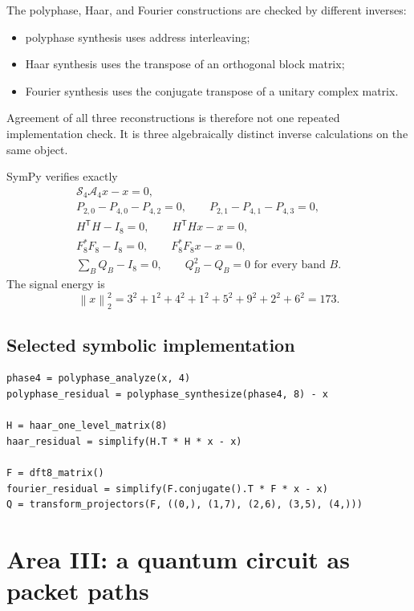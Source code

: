 \documentclass[11pt,oneside]{book}
\theoremstyle{definition}
\theoremstyle{remark}
\newcommand{\Acal}{\mathcal A}
\newcommand{\Scal}{\mathcal S}
\newcommand{\norm}[1]{\left\lVert #1\right\rVert}
\begin{document}
\begin{auditbox}
The polyphase, Haar, and Fourier constructions are checked by different inverses:
\begin{itemize}
\item polyphase synthesis uses address interleaving;
\item Haar synthesis uses the transpose of an orthogonal block matrix;
\item Fourier synthesis uses the conjugate transpose of a unitary complex matrix.
\end{itemize}
Agreement of all three reconstructions is therefore not one repeated implementation check. It is three algebraically distinct inverse calculations on the same object.
\end{auditbox}

\begin{certificate}
SymPy verifies exactly
\[
\begin{gathered}
\Scal_4\Acal_4x-x=0,\\
P_{2,0}-P_{4,0}-P_{4,2}=0,
\qquad
P_{2,1}-P_{4,1}-P_{4,3}=0,\\
H^{\mathsf T}H-I_8=0,
\qquad
H^{\mathsf T}Hx-x=0,\\
F_8^*F_8-I_8=0,
\qquad
F_8^*F_8x-x=0,\\
\sum_BQ_B-I_8=0,
\qquad
Q_B^2-Q_B=0\text{ for every band }B.
\end{gathered}
\]
The signal energy is
\[
\norm{x}_2^2=3^2+1^2+4^2+1^2+5^2+9^2+2^2+6^2=173.
\]
\end{certificate}

\section{Selected symbolic implementation}
\begin{lstlisting}
phase4 = polyphase_analyze(x, 4)
polyphase_residual = polyphase_synthesize(phase4, 8) - x

H = haar_one_level_matrix(8)
haar_residual = simplify(H.T * H * x - x)

F = dft8_matrix()
fourier_residual = simplify(F.conjugate().T * F * x - x)
Q = transform_projectors(F, ((0,), (1,7), (2,6), (3,5), (4,)))
\end{lstlisting}

\chapter{Area III: a quantum circuit as packet paths}\label{ch:quantum}
\end{document}
